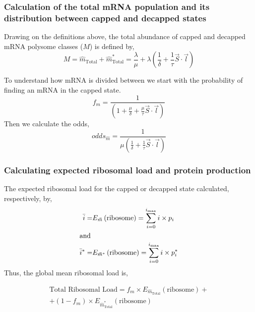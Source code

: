 \documentclass[10pt,letterpaper]{article}
\newcommand{\imax}{\ensuremath{{i_{\max}}}\xspace}
\newcommand{\mvec}{\ensuremath{\vec{m}}\xspace}
\newcommand{\mvecstar}{\ensuremath{\mvec^*}\xspace}
\newcommand{\msum}{\ensuremath{\hat{m}_{\text{Total}}}\xspace}
\newcommand{\msumstar}{\ensuremath{\hat{m}^*_{\text{Total}}}\xspace}
\newcommand{\msumtot}{\ensuremath{M}\xspace}
\newcommand{\mfrac}{\ensuremath{f_m}\xspace}
\newcommand{\ribosome}{\ensuremath{\text{ribosome}}} %
\newcommand{\MRL}{\ensuremath{\bar{i}}\xspace}
\begin{document}
\subsubsection*{Calculation of the total mRNA population and its distribution between capped and decapped states}
Drawing on the definitions above, the total abundance of capped and decapped mRNA polysome classes ($\msumtot$) is defined by,
\begin{equation}
  \msumtot = \msum + \msumstar = \frac{\lambda}{\mu} +  \lambda(\frac{1}{\delta} + \frac{1}{\tau}\vec{S} \cdot \vec{l})
\end{equation}

To understand how mRNA is divided  between we start with the probability of finding an mRNA in the capped state.
\begin{equation*}
  \mfrac = \frac{1}{(1  + \frac{\mu}{\delta} + \frac{\mu}{\tau}\vec{S} \cdot \vec{l})}	
\end{equation*}
Then we calculate the odds,
\begin{equation}\label{eq:odds}
  odds_{\hat{m}} = \frac{1}{\mu(\frac{1}{\delta} + \frac{1}{\tau}\vec{S} \cdot \vec{l})} 
\end{equation}

\subsubsection*{Calculating expected ribosomal load and protein production}
The expected ribosomal load for the capped or decapped state calculated, respectively, by,
\begin{align}\label{eq:Expected_ribo_load}
  \MRL =& E_{\mvec}\left(\ribosome\right) =\sum_{i=0}^{\imax}i \times p_{i}  \\
  \intertext{and} \nonumber
  \MRL^* =& E_{\mvecstar}\left(\ribosome\right) =\sum_{i=0}^{\imax}i \times p^*_{i}\nonumber
\end{align}
Thus, the global mean ribosomal load is,

\begin{align} \label{eq:System_ribo_load}
  \text{Total Ribosomal Load} = \mfrac\times E_{\msum} \left(\ribosome\right) + \\
  + (1-\mfrac)\times E_{\msumstar}\left(\ribosome\right) \nonumber \\
\end{align}


% 
\end{document}
